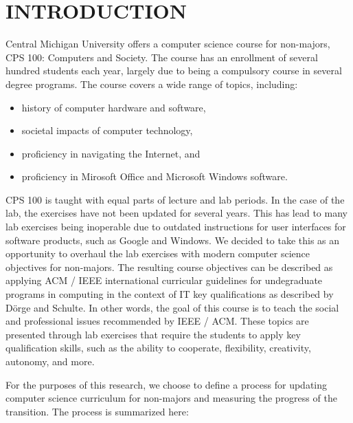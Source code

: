 \section{INTRODUCTION}

Central Michigan University offers a computer science course for non-majors,
CPS 100:  Computers and Society.  The course has an enrollment of several
hundred students each year, largely due to being a compulsory course in several
degree programs.  The course covers a wide range of topics, including:


\begin{itemize}
  \item history of computer hardware and software,
  \item societal impacts of computer technology, 
  \item proficiency in navigating the Internet, and
  \item proficiency in Mirosoft Office and Microsoft Windows software.
\end{itemize}

CPS 100 is taught with equal parts of lecture and lab periods.  In the case of
the lab, the exercises have not been updated for several years.  This
has lead to many lab exercises being inoperable due to outdated instructions for
user interfaces for software products, such as Google and Windows.  We decided
to take this as an opportunity to overhaul the lab exercises with modern computer science objectives for non-majors.  The resulting course objectives can be described
as applying ACM / IEEE international curricular guidelines for undegraduate
programs in computing in the context of IT key qualifications as described by
D\"{o}rge and Schulte.  In other words, the goal of this course is to teach the
social and professional issues recommended by IEEE / ACM.  These topics are
presented through lab exercises that require the students to apply key
qualification skills, such as the ability to cooperate, flexibility, creativity,
autonomy, and more.

For the purposes of this research, we choose to define a process for updating
computer science curriculum for non-majors and measuring the progress of the
transition.  The process is summarized here:

